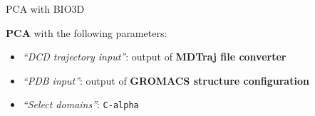 \documentclass[twocolumn]{bmcart}%
\providecommand{\tightlist}{%
  \setlength{\itemsep}{0pt}\setlength{\parskip}{0pt}}
\begin{document}
\begin{handson_box_colour}{PCA with BIO3D}


  \textbf{PCA} with the following parameters:

  \begin{itemize}
  \tightlist
  \item
    \emph{``DCD trajectory input''}: output of
    \textbf{MDTraj file converter}
  \item
    \emph{``PDB input''}: output of \textbf{GROMACS
    structure configuration}
  \item
    \emph{``Select domains''}: \texttt{C-alpha}
  \end{itemize}

\end{handson_box_colour}
\end{document}
